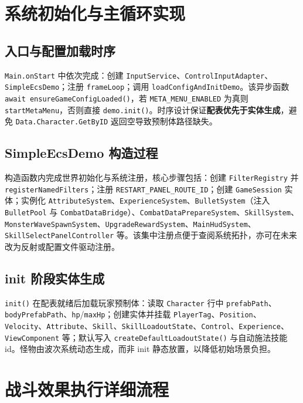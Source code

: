 ﻿
\section{系统初始化与主循环实现}

\subsection{入口与配置加载时序}

\texttt{Main.onStart} 中依次完成：创建 \texttt{InputService}、\texttt{ControlInputAdapter}、\texttt{SimpleEcsDemo}；注册 \texttt{frameLoop}；调用 \texttt{loadConfigAndInitDemo}。该异步函数 \texttt{await ensureGameConfigLoaded()}，若 \texttt{META\_MENU\_ENABLED} 为真则 \texttt{startMetaMenu}，否则直接 \texttt{demo.init()}。时序设计保证\textbf{配表优先于实体生成}，避免 \texttt{Data.Character.GetByID} 返回空导致预制体路径缺失。

\subsection{SimpleEcsDemo 构造过程}

构造函数内完成世界初始化与系统注册，核心步骤包括：创建 \texttt{FilterRegistry} 并 \texttt{registerNamedFilters}；注册 \texttt{RESTART\_PANEL\_ROUTE\_ID}；创建 \texttt{GameSession} 实体；实例化 \texttt{AttributeSystem}、\texttt{ExperienceSystem}、\texttt{BulletSystem}（注入 \texttt{BulletPool} 与 \texttt{CombatDataBridge}）、\texttt{CombatDataPrepareSystem}、\texttt{SkillSystem}、\texttt{MonsterWaveSpawnSystem}、\texttt{UpgradeRewardSystem}、\texttt{MainHudSystem}、\texttt{SkillSelectPanelController} 等。该集中注册点便于查阅系统拓扑，亦可在未来改为反射或配置文件驱动注册。

\subsection{init 阶段实体生成}

\texttt{init()} 在配表就绪后加载玩家预制体：读取 \texttt{Character} 行中 \texttt{prefabPath}、\texttt{bodyPrefabPath}、\texttt{hp}/\texttt{maxHp}；创建实体并挂载 \texttt{PlayerTag}、\texttt{Position}、\texttt{Velocity}、\texttt{Attribute}、\texttt{Skill}、\texttt{SkillLoadoutState}、\texttt{Control}、\texttt{Experience}、\texttt{ViewComponent} 等；默认写入 \texttt{createDefaultLoadoutState()} 与自动施法技能 id。怪物由波次系统动态生成，而非 init 静态放置，以降低初始场景负担。

\section{战斗效果执行详细流程}


